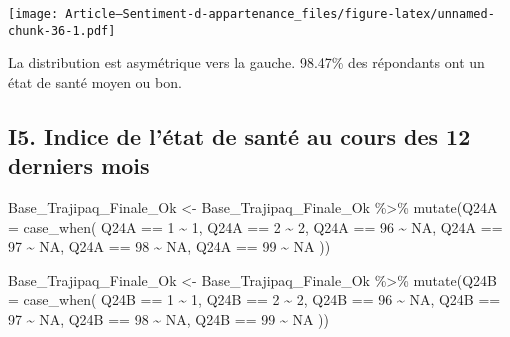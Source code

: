 \documentclass[
]{article}
\newenvironment{Shaded}{\begin{snugshade}}{\end{snugshade}}
\newcommand{\AttributeTok}[1]{\textcolor[rgb]{0.77,0.63,0.00}{#1}}
\newcommand{\ConstantTok}[1]{\textcolor[rgb]{0.00,0.00,0.00}{#1}}
\newcommand{\DecValTok}[1]{\textcolor[rgb]{0.00,0.00,0.81}{#1}}
\newcommand{\FunctionTok}[1]{\textcolor[rgb]{0.00,0.00,0.00}{#1}}
\newcommand{\NormalTok}[1]{#1}
\newcommand{\OtherTok}[1]{\textcolor[rgb]{0.56,0.35,0.01}{#1}}
\newcommand{\SpecialCharTok}[1]{\textcolor[rgb]{0.00,0.00,0.00}{#1}}
\begin{document}
\texttt{[image: Article---Sentiment-d-appartenance\_files/figure-latex/unnamed-chunk-36-1.pdf]}

La distribution est asymétrique vers la gauche. 98.47\% des répondants
ont un état de santé moyen ou bon.

\hypertarget{i5.-indice-de-luxe9tat-de-santuxe9-au-cours-des-12-derniers-mois}{%
\subsection{I5. Indice de l'état de santé au cours des 12 derniers
mois}\label{i5.-indice-de-luxe9tat-de-santuxe9-au-cours-des-12-derniers-mois}}

\begin{Shaded}
\begin{Highlighting}[]
\NormalTok{Base\_Trajipaq\_Finale\_Ok }\OtherTok{\textless{}{-}}
\NormalTok{  Base\_Trajipaq\_Finale\_Ok }\SpecialCharTok{\%\textgreater{}\%}
  \FunctionTok{mutate}\NormalTok{(}\AttributeTok{Q24A =} \FunctionTok{case\_when}\NormalTok{(}
\NormalTok{    Q24A }\SpecialCharTok{==} \DecValTok{1} \SpecialCharTok{\textasciitilde{}} \DecValTok{1}\NormalTok{,}
\NormalTok{    Q24A }\SpecialCharTok{==} \DecValTok{2} \SpecialCharTok{\textasciitilde{}} \DecValTok{2}\NormalTok{,}
\NormalTok{    Q24A }\SpecialCharTok{==} \DecValTok{96} \SpecialCharTok{\textasciitilde{}} \ConstantTok{NA}\NormalTok{,}
\NormalTok{    Q24A }\SpecialCharTok{==} \DecValTok{97} \SpecialCharTok{\textasciitilde{}} \ConstantTok{NA}\NormalTok{,}
\NormalTok{    Q24A }\SpecialCharTok{==} \DecValTok{98} \SpecialCharTok{\textasciitilde{}} \ConstantTok{NA}\NormalTok{,}
\NormalTok{    Q24A }\SpecialCharTok{==} \DecValTok{99} \SpecialCharTok{\textasciitilde{}} \ConstantTok{NA}
\NormalTok{  ))}

\NormalTok{Base\_Trajipaq\_Finale\_Ok }\OtherTok{\textless{}{-}}
\NormalTok{  Base\_Trajipaq\_Finale\_Ok }\SpecialCharTok{\%\textgreater{}\%}
  \FunctionTok{mutate}\NormalTok{(}\AttributeTok{Q24B =} \FunctionTok{case\_when}\NormalTok{(}
\NormalTok{    Q24B }\SpecialCharTok{==} \DecValTok{1} \SpecialCharTok{\textasciitilde{}} \DecValTok{1}\NormalTok{,}
\NormalTok{    Q24B }\SpecialCharTok{==} \DecValTok{2} \SpecialCharTok{\textasciitilde{}} \DecValTok{2}\NormalTok{,}
\NormalTok{    Q24B }\SpecialCharTok{==} \DecValTok{96} \SpecialCharTok{\textasciitilde{}} \ConstantTok{NA}\NormalTok{,}
\NormalTok{    Q24B }\SpecialCharTok{==} \DecValTok{97} \SpecialCharTok{\textasciitilde{}} \ConstantTok{NA}\NormalTok{,}
\NormalTok{    Q24B }\SpecialCharTok{==} \DecValTok{98} \SpecialCharTok{\textasciitilde{}} \ConstantTok{NA}\NormalTok{,}
\NormalTok{    Q24B }\SpecialCharTok{==} \DecValTok{99} \SpecialCharTok{\textasciitilde{}} \ConstantTok{NA}
\NormalTok{  ))}


\end{Highlighting}
\end{Shaded}
\end{document}
